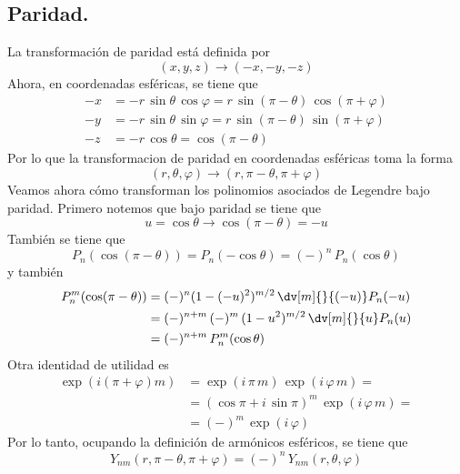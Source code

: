 \subsection*{Paridad.}
La transformación de paridad está definida por
\[ (x, y, z) \to (-x, -y, -z) \]
Ahora, en coordenadas esféricas, se tiene que
\begin{align*}
-x &= - r \, \sin \theta \, \cos \varphi =  r \, \sin (\pi - \theta) \, \cos (\pi + \varphi) \\
-y &= - r \, \sin \theta \, \sin \varphi =  r \, \sin (\pi - \theta) \, \sin (\pi + \varphi) \\
-z &= - r \, \cos \theta = \cos (\pi - \theta)
\end{align*}
Por lo que la transformaci{on de paridad en coordenadas esféricas toma la forma
\[ (r, \theta, \varphi) \to (r, \pi - \theta, \pi + \varphi) \]
Veamos ahora cómo transforman los polinomios asociados de Legendre bajo paridad. Primero notemos que bajo paridad se tiene que
\[ u = \cos \theta \to \cos (\pi - \theta) = -u \]
También se tiene que
\[ P_{n} (\cos (\pi - \theta))  = P_{n}(-\cos \theta) = (-)^{n} \, P_{n} (\cos \theta)  \]
y también
\begin{align*}
P_{n}^{m} (\cos (\pi - \theta)) &= (-)^{n} (1 - (-u)^{2})^{m/2} \, \dv[m]{}{(-u)} P_{n}(-u) \\
&= (-)^{n+m} \, (-)^{m} \, (1 - u^{2})^{m/2} \, \dv[m]{}{u} P_{n}(u) \\
&= (-)^{n+m} \, P_{n}^{m} (\cos \theta)
\end{align*}
Otra identidad de utilidad es
\begin{align*}
\exp(i(\pi + \varphi)m) &= \exp(i \, \pi \, m) \, \exp(i \, \varphi \, m) = \\
&=  (\cos \pi + i \, \sin \pi)^{m} \, \exp(i \, \varphi  \, m) = \\
&=  (-)^{m} \, \exp(i \, \varphi)
\end{align*}
Por lo tanto, ocupando la definición de armónicos esféricos, se tiene que
\[ Y_{nm}(r, \pi - \theta, \pi + \varphi) = (-)^{n} \, Y_{nm} (r, \theta, \varphi)  \]
}
